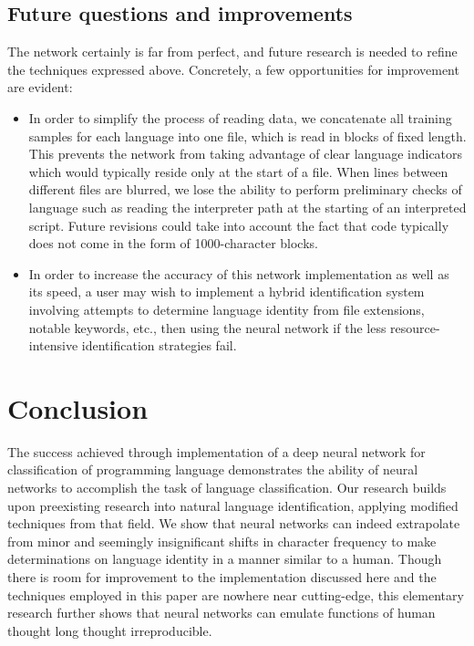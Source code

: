 \documentclass{article}
\begin{document}
\subsection{Future questions and improvements}
The network certainly is far from perfect, and future research is needed to refine the techniques expressed above. Concretely, a few opportunities for improvement are evident:
\begin{itemize}
    \item{In order to simplify the process of reading data, we concatenate all training samples for each language into one file, which is read in blocks of fixed length. This prevents the network from taking advantage of clear language indicators which would typically reside only at the start of a file. When lines between different files are blurred, we lose the ability to perform preliminary checks of language such as reading the interpreter path at the starting of an interpreted script. Future revisions could take into account the fact that code typically does not come in the form of 1000-character blocks.}
  \item{In order to increase the accuracy of this network implementation as well as its speed, a user may wish to implement a hybrid identification system involving attempts to determine language identity from file extensions, notable keywords, etc., then using the neural network if the less resource-intensive identification strategies fail.}
\end{itemize}

\section{Conclusion}
The success achieved through implementation of a deep neural network for classification of programming language demonstrates the ability of neural networks to accomplish the task of language classification. Our research builds upon preexisting research into natural language identification, applying modified techniques from that field. We show that neural networks can indeed extrapolate from minor and seemingly insignificant shifts in character frequency to make determinations on language identity in a manner similar to a human. Though there is room for improvement to the implementation discussed here and the techniques employed in this paper are nowhere near cutting-edge, this elementary research further shows that neural networks can emulate functions of human thought long thought irreproducible.
\end{document}
